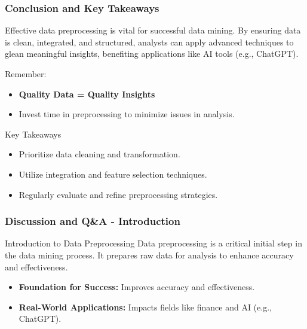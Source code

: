 \documentclass[aspectratio=169]{beamer}
\begin{document}
\begin{frame}[fragile]
    \frametitle{Conclusion and Key Takeaways}
    Effective data preprocessing is vital for successful data mining. By ensuring data is clean, integrated, and structured, analysts can apply advanced techniques to glean meaningful insights, benefiting applications like AI tools (e.g., ChatGPT).

    \begin{block}{Remember:}
        \begin{itemize}
            \item \textbf{Quality Data = Quality Insights}
            \item Invest time in preprocessing to minimize issues in analysis.
        \end{itemize}
    \end{block}

    \begin{block}{Key Takeaways}
        \begin{itemize}
            \item Prioritize data cleaning and transformation.
            \item Utilize integration and feature selection techniques.
            \item Regularly evaluate and refine preprocessing strategies.
        \end{itemize}
    \end{block}
\end{frame}

\begin{frame}[fragile]
    \frametitle{Discussion and Q\&A - Introduction}
    \begin{block}{Introduction to Data Preprocessing}
        Data preprocessing is a critical initial step in the data mining process. It prepares raw data for analysis to enhance accuracy and effectiveness.
    \end{block}
    \begin{itemize}
        \item \textbf{Foundation for Success:} Improves accuracy and effectiveness.
        \item \textbf{Real-World Applications:} Impacts fields like finance and AI (e.g., ChatGPT).
    \end{itemize}
\end{frame}
\end{document}
